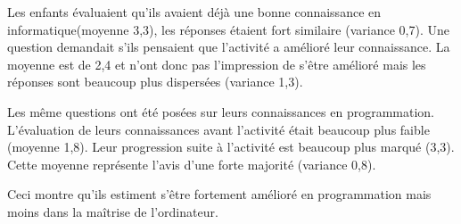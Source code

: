 Les enfants évaluaient qu'ils avaient déjà une bonne connaissance en informatique(moyenne 3,3), les réponses étaient fort similaire (variance 0,7). Une question demandait s'ils pensaient que l'activité a amélioré leur connaissance. La moyenne est de 2,4  et n'ont donc pas l'impression de s'être amélioré mais les réponses sont beaucoup plus dispersées (variance 1,3).

Les même questions ont été posées sur leurs connaissances en programmation. L'évaluation de leurs connaissances avant l'activité était beaucoup plus faible (moyenne 1,8). Leur progression suite à l'activité est beaucoup plus marqué (3,3). Cette moyenne représente l'avis d'une forte majorité (variance 0,8).

Ceci montre qu'ils estiment s'être fortement amélioré en programmation mais moins dans la maîtrise de l'ordinateur.


